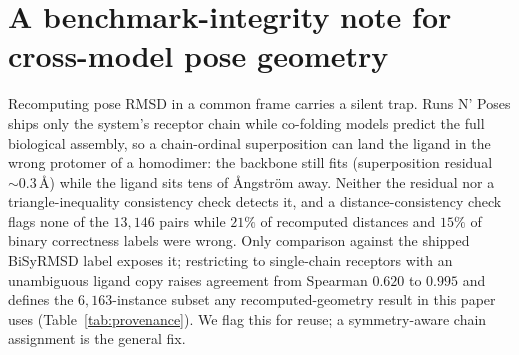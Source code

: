 \documentclass[10pt]{article}
\begin{document}
\section{A benchmark-integrity note for cross-model pose geometry}\label{app:integrity}
\small Recomputing pose RMSD in a common frame carries a silent trap. Runs N' Poses ships only the system's
receptor chain while co-folding models predict the full biological assembly, so a chain-ordinal
superposition can land the ligand in the wrong protomer of a homodimer: the backbone still fits
(superposition residual $\sim\!0.3$\,\AA) while the ligand sits tens of \AA ngstr\"om away. Neither the
residual nor a triangle-inequality consistency check detects it, and a distance-consistency check flags none of the $13{,}146$ pairs while $21\%$ of recomputed distances and $15\%$ of binary correctness labels were wrong. Only
comparison against the shipped BiSyRMSD label exposes it; restricting to single-chain receptors with an
unambiguous ligand copy raises agreement from Spearman $0.620$ to $0.995$ and defines the $6{,}163$-instance
subset any recomputed-geometry result in this paper uses (Table~\ref{tab:provenance}). We flag this for
reuse; a symmetry-aware chain assignment is the general fix.
\end{document}
